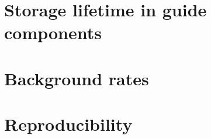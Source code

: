 \documentclass[10pt,letterpaper]{article}
\begin{document}
\fi

\section{Storage lifetime in guide components}




\section{Background rates}
\label{sec:background}



\section{Reproducibility}
\end{document}
